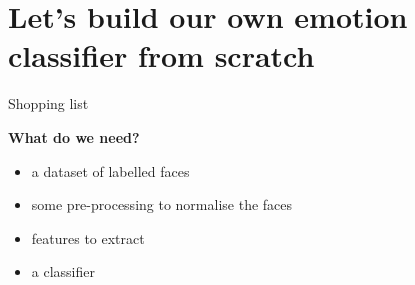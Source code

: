 \documentclass[compress]{beamer}
\begin{document}


\section[Emotion classifier]{Let's build our own emotion classifier from scratch}

\begin{frame}{Shopping list}

    \begin{center}
        {\bf What do we need?}
    \end{center}

    \pause

    \begin{itemize}
        \item<+-> a dataset of labelled faces
        \item<+-> some pre-processing to normalise the faces
        \item<+-> features to extract
        \item<+-> a classifier
    \end{itemize}
\end{frame}

\end{document}
